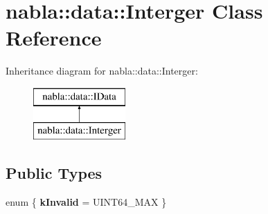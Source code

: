 \hypertarget{classnabla_1_1data_1_1_interger}{}\section{nabla\+::data\+::Interger Class Reference}
\label{classnabla_1_1data_1_1_interger}
Inheritance diagram for nabla\+::data\+::Interger\+:\begin{figure}[H]
\begin{center}
\leavevmode
\includegraphics[height=2.000000cm]{classnabla_1_1data_1_1_interger}
\end{center}
\end{figure}
\subsection*{Public Types}
\begin{DoxyCompactItemize}
\item 
\mbox{\label{classnabla_1_1data_1_1_interger_aa460020920651f32af7c721750062aae}} 
enum \{ {\bfseries k\+Invalid} = U\+I\+N\+T64\+\_\+\+M\+AX
 \}
\end{DoxyCompactItemize}
